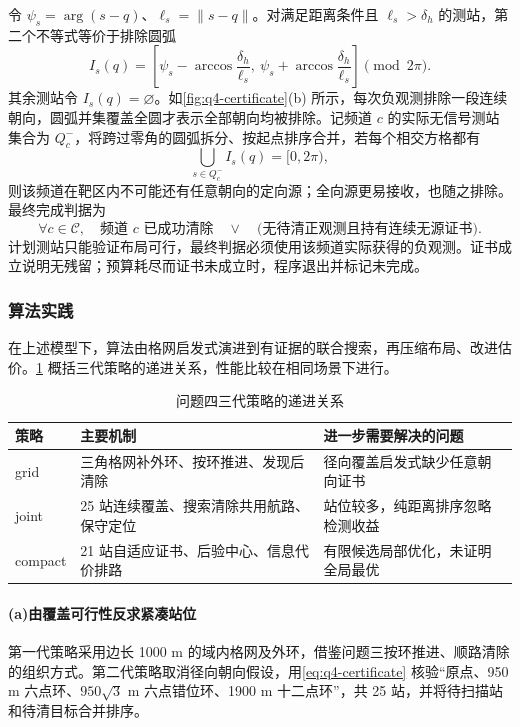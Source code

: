 令 $\psi_s=\arg(s-q)$、$\ell_s=\|s-q\|$。对满足距离条件且 $\ell_s>\delta_h$ 的测站，第二个不等式等价于排除圆弧
\begin{equation}\label{eq:q4-arc}
 I_s(q)=\left[\psi_s-\arccos\frac{\delta_h}{\ell_s},\ \psi_s+\arccos\frac{\delta_h}{\ell_s}\right]\pmod{2\pi}.
\end{equation}
其余测站令 $I_s(q)=\varnothing$。如\cref{fig:q4-certificate}(b) 所示，每次负观测排除一段连续朝向，圆弧并集覆盖全圆才表示全部朝向均被排除。记频道 $c$ 的实际无信号测站集合为 $Q_c^-$，将跨过零角的圆弧拆分、按起点排序合并，若每个相交方格都有
\begin{equation}\label{eq:q4-certificate}
 \bigcup_{s\in Q_c^-}I_s(q)=[0,2\pi),
\end{equation}
则该频道在靶区内不可能还有任意朝向的定向源；全向源更易接收，也随之排除。最终完成判据为
\begin{equation}\label{eq:q4-stop}
 \forall c\in\mathcal C,\quad
 \text{频道 $c$ 已成功清除}\quad\lor\quad
 \bigl(\text{无待清正观测且持有连续无源证书}\bigr).
\end{equation}
计划测站只能验证布局可行，最终判据必须使用该频道实际获得的负观测。证书成立说明无残留；预算耗尽而证书未成立时，程序退出并标记未完成。



\subsubsection{算法实践}
在上述模型下，算法由格网启发式演进到有证据的联合搜索，再压缩布局、改进估价。\cref{tab:q4-versions} 概括三代策略的递进关系，性能比较在相同场景下进行。
\begin{table}[!htbp]\centering
\caption{问题四三代策略的递进关系}\label{tab:q4-versions}
\begin{tabular}{@{}lp{}p{}@{}}\toprule
策略 & 主要机制 & 进一步需要解决的问题\\\midrule
grid & 三角格网补外环、按环推进、发现后清除 & 径向覆盖启发式缺少任意朝向证书\\
joint & 25 站连续覆盖、搜索清除共用航路、保守定位 & 站位较多，纯距离排序忽略检测收益\\
compact & 21 站自适应证书、后验中心、信息代价排路 & 有限候选局部优化，未证明全局最优\\\bottomrule
\end{tabular}\end{table}

\paragraph{\textbf{(a)}\hspace{0.2em}由覆盖可行性反求紧凑站位}
第一代策略采用边长 1000 m 的域内格网及外环，借鉴问题三按环推进、顺路清除的组织方式。第二代策略取消径向朝向假设，用\cref{eq:q4-certificate} 核验“原点、950 m 六点环、$950\sqrt3$ m 六点错位环、1900 m 十二点环”，共 25 站，并将待扫描站和待清目标合并排序。

